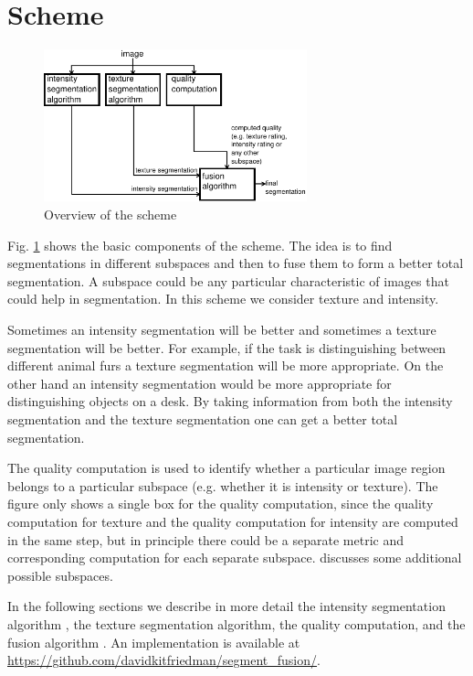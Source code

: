 \documentclass[twocolumn]{article}
\begin{document}
\section{Scheme}


\begin{figure}[!t]
\centering
\includegraphics[width=3in]{overview}
\caption{Overview of the scheme}
\label{fig:overview}
\end{figure}


Fig. \ref{fig:overview} shows the basic components of the scheme. The
idea is to find segmentations in different subspaces and then to fuse
them to form a better total segmentation. A subspace could be any
particular characteristic of images that could help in
segmentation. In this scheme we consider texture and intensity. 


Sometimes an intensity segmentation will be better and sometimes
a texture segmentation will be better. For example, if the 
task is distinguishing between different animal furs a texture
segmentation will be more appropriate. On the other hand an intensity
segmentation would be more appropriate for distinguishing objects on a
desk. By taking information from both the intensity
segmentation and the texture segmentation one can get a
better total segmentation.

The quality computation is used to identify whether a particular image
region belongs to a particular subspace (e.g. whether it is intensity
or texture). The figure only shows a single box for the quality
computation, since the quality computation for texture and the quality
computation for intensity are computed in the same step, but in
principle there could be a separate metric and corresponding
computation for each separate subspace. \cite{prev} discusses some
additional possible subspaces. 

In the following sections we describe in more detail the
intensity segmentation algorithm \cite{intensity}, the texture
segmentation algorithm, the quality computation, and the
fusion algorithm \cite{fusion1}. An implementation is available at \url{https://github.com/davidkitfriedman/segment_fusion/}. 
\end{document}
